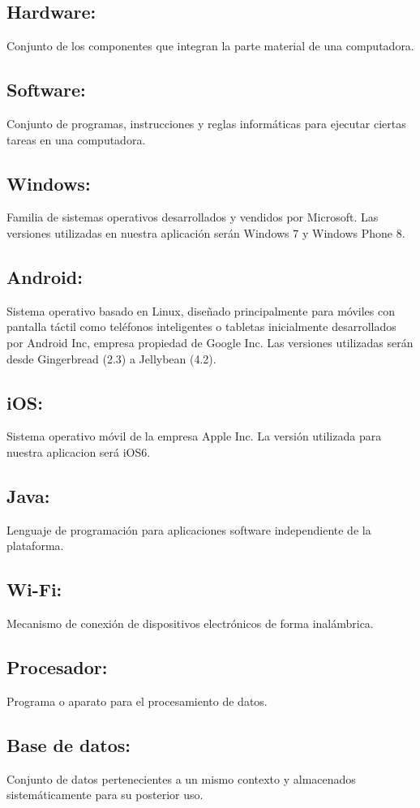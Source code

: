 \documentclass[spanish,a4paper,11pt, twoside]{report}	%
\begin{document}
\subsection{Hardware:} Conjunto de los componentes que integran la parte material de una computadora.
\subsection{Software:} Conjunto de programas, instrucciones y reglas informáticas para ejecutar ciertas tareas en una computadora.
\subsection{Windows:}Familia de sistemas operativos desarrollados y vendidos por Microsoft. Las versiones utilizadas en nuestra aplicación serán Windows 7 y Windows Phone 8.
\subsection{Android:} Sistema operativo basado en Linux, diseñado principalmente para móviles con pantalla táctil como teléfonos inteligentes o tabletas inicialmente desarrollados por Android Inc, empresa propiedad de Google Inc. Las versiones utilizadas serán desde Gingerbread (2.3) a Jellybean (4.2).
\subsection{iOS:} Sistema operativo móvil de la empresa Apple Inc. La versión utilizada para nuestra aplicacion será iOS6.
\subsection{Java:} Lenguaje de programación para aplicaciones software independiente de la plataforma.
\subsection{Wi-Fi:} Mecanismo de conexión de dispositivos electrónicos de forma inalámbrica.
\subsection{Procesador:} Programa o aparato para el procesamiento de datos.
\subsection{Base de datos:} Conjunto de datos pertenecientes a un mismo contexto y almacenados sistemáticamente para su posterior uso.
\end{document}
